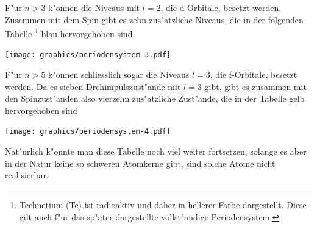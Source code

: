 F"ur $n>3$ k"onnen die Niveaus mit $l=2$, die d-Orbitale, besetzt werden.
Zusammen mit
dem Spin gibt es zehn zus"atzliche Niveaus, die in der folgenden Tabelle
\footnote{Technetium (Tc) ist radioaktiv und daher in hellerer Farbe
%
dargestellt. Diese gilt auch f"ur das sp"ater dargestellte vollst"andige
Periodensystem.}
blau hervorgehoben sind.
\begin{center}
\texttt{[image: graphics/periodensystem-3.pdf]}
\end{center}

F"ur $n>5$ k"onnen schliesslich sogar die Niveaus $l=3$, die
f-Orbitale, besetzt werden.
Da es sieben Drehimpulszust"ande mit $l=3$ gibt, gibt es zusammen mit den
Spinzust"anden also vierzehn zus"atzliche Zust"ande, die in
der Tabelle gelb hervorgehoben sind
\begin{center}
\texttt{[image: graphics/periodensystem-4.pdf]}
\end{center}
Nat"urlich k"onnte man diese Tabelle noch viel weiter fortsetzen,
solange es aber in der Natur keine so schweren Atomkerne gibt, sind solche Atome
nicht realisierbar.

